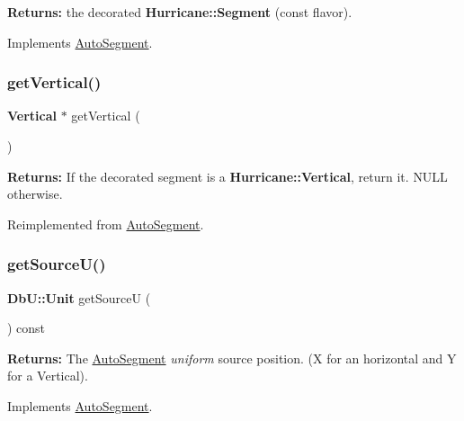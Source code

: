{\bfseries Returns\+:} the decorated \textbf{ Hurricane\+::\+Segment} (const flavor). 

Implements \hyperlink{classKatabatic_1_1AutoSegment_a53877ff5ef48eb0030c2581a6eeb3c09}{Auto\+Segment}.

\mbox{\label{classKatabatic_1_1AutoVertical_ab6a809b6f3ef3cf5385fa35580e31e7a}} 
\subsubsection{\texorpdfstring{get\+Vertical()}{getVertical()}}
{\footnotesize\ttfamily \textbf{ Vertical} $\ast$ get\+Vertical (\begin{DoxyParamCaption}{ }\end{DoxyParamCaption})\hspace{0.3cm}{\ttfamily [virtual]}}

{\bfseries Returns\+:} If the decorated segment is a \textbf{ Hurricane\+::\+Vertical}, return it. {\ttfamily N\+U\+LL} otherwise. 

Reimplemented from \hyperlink{classKatabatic_1_1AutoSegment_ab6a809b6f3ef3cf5385fa35580e31e7a}{Auto\+Segment}.

\mbox{\label{classKatabatic_1_1AutoVertical_ad521ffba761b0e81b7b81b99d62f76f9}} 
\subsubsection{\texorpdfstring{get\+Source\+U()}{getSourceU()}}
{\footnotesize\ttfamily \textbf{ Db\+U\+::\+Unit} get\+SourceU (\begin{DoxyParamCaption}{ }\end{DoxyParamCaption}) const\hspace{0.3cm}{\ttfamily [virtual]}}

{\bfseries Returns\+:} The \hyperlink{classKatabatic_1_1AutoSegment}{Auto\+Segment} {\itshape uniform} source position. (X for an horizontal and Y for a Vertical). 

Implements \hyperlink{classKatabatic_1_1AutoSegment_aeaa1543880686755e389c4807128428f}{Auto\+Segment}.



